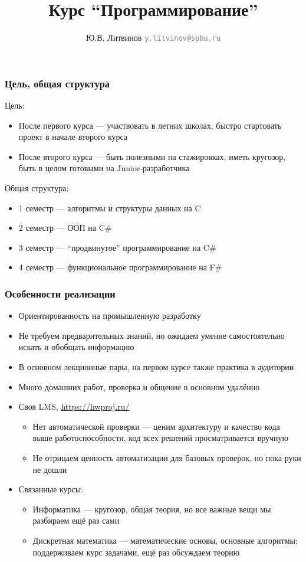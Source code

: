 \documentclass[xetex,mathserif,serif]{beamer}
\title{Курс ``Программирование''}
\author[Юрий Литвинов]{Ю.В. Литвинов \newline 
    \textcolor{gray}{\small\texttt{y.litvinov@spbu.ru}}
}
\date{}
\begin{document}
    \begin{frame}
        \frametitle{Цель, общая структура}
        Цель:
        \begin{itemize}
            \item После первого курса --- участвовать в летних школах, быстро стартовать проект в начале второго курса
            \item После второго курса --- быть полезными на стажировках, иметь кругозор, быть в целом готовыми на Junior-разработчика
        \end{itemize}
        Общая структура:
        \begin{itemize}
            \item 1 семестр --- алгоритмы и структуры данных на C
            \item 2 семестр --- ООП на C\#
            \item 3 семестр --- ``продвинутое'' программирование на C\#
            \item 4 семестр --- функциональное программирование на F\#
        \end{itemize}
    \end{frame}

    \begin{frame}
        \frametitle{Особенности реализации}
        \begin{itemize}
            \item Ориентированность на промышленную разработку
            \item Не требуем предварительных знаний, но ожидаем умение самостоятельно искать и обобщать информацию
            \item В основном лекционные пары, на первом курсе также практика в аудитории
            \item Много домашних работ, проверка и общение в основном удалённо
            \item Своя LMS, \url{https://hwproj.ru/}
            \begin{itemize}
                \item Нет автоматической проверки --- ценим архитектуру и качество кода выше работоспособности, код всех решений просматривается вручную
                \item Не отрицаем ценность автоматизации для базовых проверок, но пока руки не дошли
            \end{itemize}
            \item Связанные курсы: 
            \begin{itemize}
                \item Информатика --- кругозор, общая теория, но все важные вещи мы разбираем ещё раз сами
                \item Дискретная математика --- математические основы, основные алгоритмы; поддерживаем курс задачами, ещё раз обсуждаем теорию
            \end{itemize}
        \end{itemize}
    \end{frame}
\end{document}
